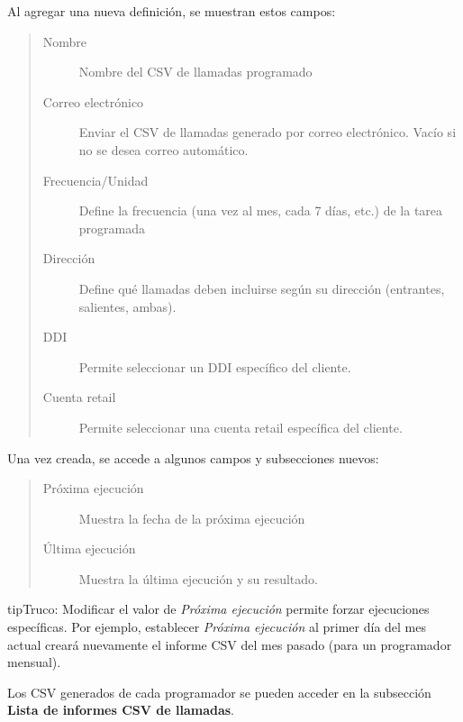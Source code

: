 \documentclass[letterpaper,10pt,spanish]{sphinxmanual}
\begin{document}
Al agregar una nueva definición, se muestran estos campos:
\begin{quote}
\begin{description}
\item[{Nombre}] \leavevmode
Nombre del CSV de llamadas programado

\item[{Correo electrónico}] \leavevmode
Enviar el CSV de llamadas generado por correo electrónico. Vacío si no se desea correo automático.

\item[{Frecuencia/Unidad}] \leavevmode
Define la frecuencia (una vez al mes, cada 7 días, etc.) de la tarea programada

\item[{Dirección}] \leavevmode
Define qué llamadas deben incluirse según su dirección (entrantes, salientes, ambas).

\item[{DDI}] \leavevmode
Permite seleccionar un DDI específico del cliente.

\item[{Cuenta retail}] \leavevmode
Permite seleccionar una cuenta retail específica del cliente.

\end{description}
\end{quote}

Una vez creada, se accede a algunos campos y subsecciones nuevos:
\begin{quote}
\begin{description}
\item[{Próxima ejecución}] \leavevmode
Muestra la fecha de la próxima ejecución

\item[{Última ejecución}] \leavevmode
Muestra la última ejecución y su resultado.

\end{description}
\end{quote}

\begin{notice}{tip}{Truco:}
Modificar el valor de \emph{Próxima ejecución} permite forzar ejecuciones específicas. Por ejemplo, establecer \emph{Próxima ejecución} al primer día del mes actual creará nuevamente el informe CSV del mes pasado (para un programador mensual).
\end{notice}

Los CSV generados de cada programador se pueden acceder en la subsección \textbf{Lista de informes CSV de llamadas}.
\end{document}
